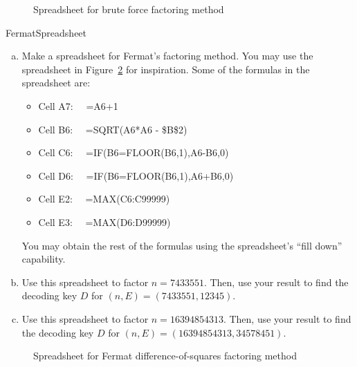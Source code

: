 \begin{figure}[h]
\caption{Spreadsheet for brute force factoring method}
\label{fig:bf}
\end{figure}


\begin{exercise}{FermatSpreadsheet}
\begin{enumerate}[(a)]
\item
Make a spreadsheet for Fermat's factoring method. You may use the spreadsheet in Figure~\ref{fig:FermaFact} for inspiration. Some of the formulas in the spreadsheet are:
\begin{itemize}
\item
Cell A7: ~~=A6+1
\item
Cell B6:  ~~=SQRT(A6*A6 - \$B\$2)
\item
Cell C6:  ~~=IF(B6=FLOOR(B6,1),A6-B6,0)
\item
Cell D6:  ~~=IF(B6=FLOOR(B6,1),A6+B6,0)
\item
Cell E2: ~~=MAX(C6:C99999)
\item
Cell E3: ~~=MAX(D6:D99999)
\end{itemize}
You may obtain the rest of the formulas using the spreadsheet's ``fill down'' capability.
\item
Use this spreadsheet to factor $n=7433551$. Then, use your result to find the decoding key $D$ for $(n,E) = (7433551,12345)$.
\item
Use this spreadsheet to factor $n=16394854313$. Then, use your result to find the decoding key $D$ for $(n,E) = (16394854313,34578451)$. 
\end{enumerate}
\end{exercise}


\begin{figure}[h]
\caption{Spreadsheet for Fermat difference-of-squares factoring method}
\label{fig:FermaFact}
\end{figure}

